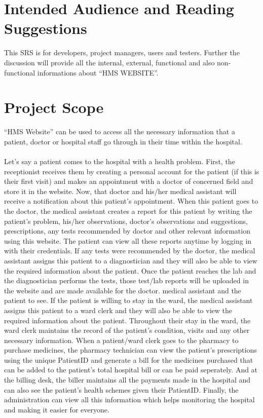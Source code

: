 \documentclass{scrreprt}
\begin{document}
\section{Intended Audience and Reading Suggestions}
This SRS is for developers, project managers, users and testers. Further the discussion will provide all the internal, external, functional and also non-functional informations about ``HMS WEBSITE''.

\section{Project Scope}
``HMS Website'' can be used to access all the necessary information that a patient, doctor or hospital staff go through in their time within the hospital. \\
\\
Let's say a patient comes to the hospital with a health problem. First, the receptionist receives them by creating a personal account for the patient (if this is their first visit) and makes an appointment with a doctor of concerned field and store it in the website. Now, that doctor and his/her medical assistant will receive a notification about this patient's appointment. When this patient goes to the doctor, the medical assistant creates a report for this patient by writing the patient's problem, his/her observations, doctor's observations and suggestions, prescriptions, any tests recommended by doctor and other relevant information using this website. The patient can view all these reports anytime by logging in with their credentials. If any tests were recommended by the doctor, the medical assistant assigns this patient to a diagnostician and they will also be able to view the required information about the patient. Once the patient reaches the lab and the diagnostician performs the tests, those test/lab reports will be uploaded in the website and are made available for the doctor. medical assistant and the patient to see. If the patient is willing to stay in the ward, the medical assistant assigns this patient to a ward clerk and they will also be able to view the required information about the patient. Throughout their stay in the ward, the ward clerk maintains the record of the patient's condition, visits and any other necessary information. When a patient/ward clerk goes to the pharmacy to purchase medicines, the pharmacy technician can view the patient's prescriptions using the unique PatientID and generate a bill for the medicines purchased that can be added to the patient's total hospital bill or can be paid seperately. And at the billing desk, the biller maintains all the payments made in the hospital and can also see the patient's health schemes given their PatientID. Finally, the administration can view all this information which helps monitoring the hospital and making it easier for everyone.
\end{document}
